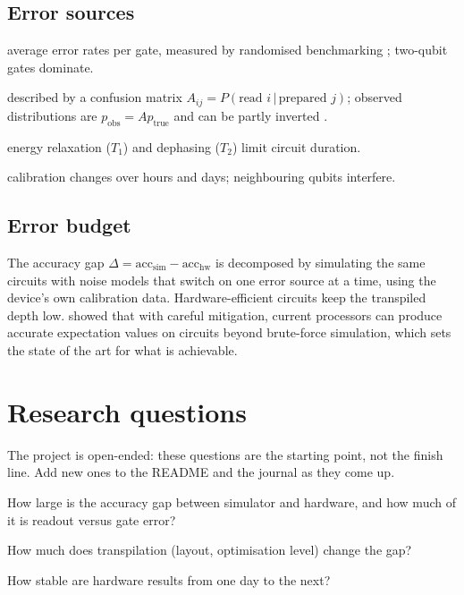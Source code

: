 \documentclass[11pt,a4paper]{article}
\begin{document}
\subsection{Error sources}
\begin{description}[style=nextline,leftmargin=1.2em]
  \item[Gate errors] average error rates per gate, measured by randomised benchmarking \citep{magesan2011};
        two-qubit gates dominate.
  \item[Readout errors] described by a confusion matrix $A_{ij}=P(\text{read }i\,|\,\text{prepared }j)$; observed
        distributions are $p_{\text{obs}}=Ap_{\text{true}}$ and can be partly inverted \citep{bravyi2021readout}.
  \item[Decoherence] energy relaxation ($T_1$) and dephasing ($T_2$) limit circuit duration.
  \item[Drift and crosstalk] calibration changes over hours and days; neighbouring qubits interfere.
\end{description}

\subsection{Error budget}
The accuracy gap $\Delta=\text{acc}_{\text{sim}}-\text{acc}_{\text{hw}}$ is decomposed by simulating the
same circuits with noise models that switch on one error source at a time, using the device's own
calibration data. Hardware-efficient circuits \citep{kandala2017} keep the transpiled depth low.
\citet{kim2023} showed that with careful mitigation, current processors can produce accurate expectation
values on circuits beyond brute-force simulation, which sets the state of the art for what is achievable.

\section{Research questions}
The project is open-ended: these questions are the starting point, not the finish line. Add new
ones to the README and the journal as they come up.

\begin{rqlist}
  \item How large is the accuracy gap between simulator and hardware, and how much of it is readout versus gate error?
  \item How much does transpilation (layout, optimisation level) change the gap?
  \item How stable are hardware results from one day to the next?
\end{rqlist}
\end{document}
